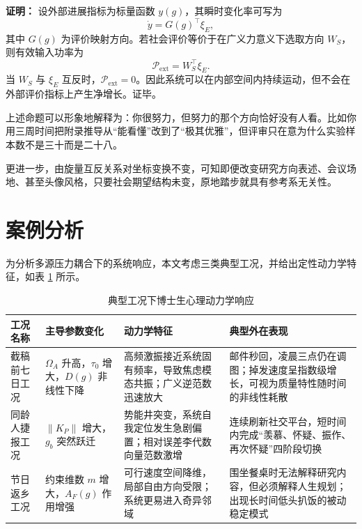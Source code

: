 \documentclass[UTF8,twocolumn,a4paper]{ctexart}
\begin{document}
\noindent\textbf{证明：}
设外部进展指标为标量函数 $y(g)$，其瞬时变化率可写为
\begin{equation}
\dot{y}=G(g)^\top \xi_E,
\end{equation}
其中 $G(g)$ 为评价映射方向。若社会评价等价于在广义力意义下选取方向 $W_S$，则有效输入功率为
\begin{equation}
\mathcal{P}_{\mathrm{ext}}=W_S^\top \xi_E.
\end{equation}
当 $W_S$ 与 $\xi_E$ 互反时，$\mathcal{P}_{\mathrm{ext}}=0$。因此系统可以在内部空间内持续运动，但不会在外部评价指标上产生净增长。证毕。

上述命题可以形象地解释为：你很努力，但努力的那个方向恰好没有人看。比如你用三周时间把附录推导从“能看懂”改到了“极其优雅”，但评审只在意为什么实验样本数不是三十而是二十八。

更进一步，由旋量互反关系对坐标变换不变，可知即便改变研究方向表述、会议场地、甚至头像风格，只要社会期望结构未变，原地踏步就具有参考系无关性。

\section{案例分析}

为分析多源压力耦合下的系统响应，本文考虑三类典型工况，并给出定性动力学特征，如表 \ref{tab:case} 所示。

\begin{table}[t]
\centering
\caption{典型工况下博士生心理动力学响应}
\label{tab:case}
\begin{tabular}{p{2.9cm} p{3.4cm} p{4.1cm} p{5.0cm}}
\toprule
工况名称 & 主导参数变化 & 动力学特征 & 典型外在表现 \\
\midrule
截稿前七日工况 &
$\Omega_A$ 升高，$\tau_0$ 增大，$D(g)$ 非线性下降 &
高频激振接近系统固有频率，导致焦虑模态共振；广义逆范数迅速放大 &
邮件秒回，凌晨三点仍在调图；掉发速度呈指数级增长，可视为质量特性随时间的非线性耗散 \\

同龄人捷报工况 &
$\|K_P\|$ 增大，$g_b$ 突然跃迁 &
势能井突变，系统自我定位发生急剧偏置；相对误差李代数向量范数激增 &
连续刷新社交平台，短时间内完成“羡慕、怀疑、振作、再次怀疑”四阶段切换 \\

节日返乡工况 &
约束维数 $m$ 增大，$A_F(g)$ 作用增强 &
可行速度空间降维，局部自由方向受限；系统更易进入奇异邻域 &
围坐餐桌时无法解释研究内容，但必须解释人生规划；出现长时间低头扒饭的被动稳定模式 \\
\bottomrule
\end{tabular}
\end{table}
\end{document}
